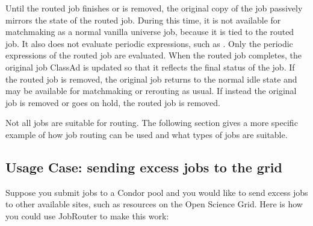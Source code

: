 Until the routed job finishes or is removed, the original copy of the
job passively mirrors the state of the routed job.  During this time,
it is not available for matchmaking as a normal vanilla universe job,
because it is tied to the routed job.  It also does not evaluate
periodic expressions, such as .  Only the periodic
expressions of the routed job are evaluated.  When the routed job
completes, the original job ClassAd is updated so that it reflects the
final status of the job.  If the routed job is removed, the original
job returns to the normal idle state and may be available for
matchmaking or rerouting as usual.  If instead the original job is
removed or goes on hold, the routed job is removed.

Not all jobs are suitable for routing.  The following section gives a
more specific example of how job routing can be used and what types of
jobs are suitable.

\subsection{Usage Case: sending excess jobs to the grid}

Suppose you submit jobs to a Condor pool and you would like to send
excess jobs to other available sites, such as resources on the Open
Science Grid.  Here is how you could use JobRouter to make this work:

